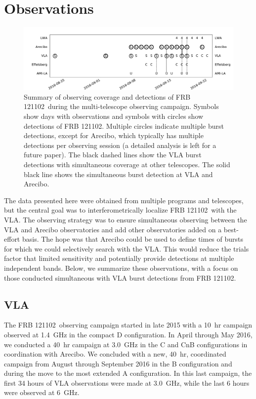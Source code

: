 \documentclass{emulateapj}
\newcommand{\frb}{FRB 121102}
\begin{document}
\section{Observations}

\begin{figure}[t]
\begin{center}
\includegraphics[width=2\columnwidth]{timeline}
\caption{Summary of observing coverage and detections of \frb\ during the multi-telescope observing campaign. Symbols show days with observations and symbols with circles show detections of \frb. Multiple circles indicate multiple burst detections, except for Arecibo, which typically has multiple detections per observing session (a detailed analysis is left for a future paper). The black dashed lines show the VLA burst detections with simultaneous coverage at other telescopes. The solid black line shows the simultaneous burst detection at VLA and Arecibo.
\label{fig:multi}}
\end{center}
\end{figure}

The data presented here were obtained from multiple programs and telescopes, but the central goal was to interferometrically localize \frb\ with the VLA. The observing strategy was to ensure simultaneous observing between the VLA and Arecibo observatories and add other observatories added on a best-effort basis. The hope was that Arecibo could be used to define times of bursts for which we could selectively search with the VLA. This would reduce the trials factor that limited sensitivity and potentially provide detections at multiple independent bands. Below, we summarize these observations, with a focus on those conducted simultaneous with VLA burst detections from \frb.

\subsection{VLA}
The \frb\ observing campaign started in late 2015 with a 10~hr campaign observed at 1.4~GHz in the compact D configuration. In April through May 2016, we conducted a 40~hr campaign at 3.0~GHz in the C and CnB configurations in coordination with Arecibo. We concluded with a new, 40~hr, coordinated campaign from August through September 2016 in the B configuration and during the move to the most extended A configuration. In this last campaign, the first 34 hours of VLA observations were made at 3.0~GHz, while the last 6 hours were observed at 6~GHz.
\end{document}
